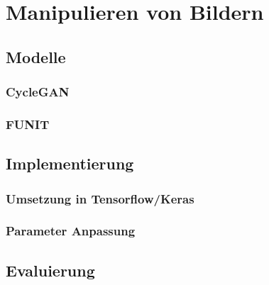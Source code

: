 \chapter{Manipulieren von Bildern}\label{chp:bildmanipulation} %
\glsresetall

 \section{Modelle} %
 
\subsection{CycleGAN}%
 
 \subsection{FUNIT}%
 
 \section{Implementierung} %
 
 \subsection{Umsetzung in Tensorflow/Keras}
 
 \subsection{Parameter Anpassung} %
 
 \section{Evaluierung} %

